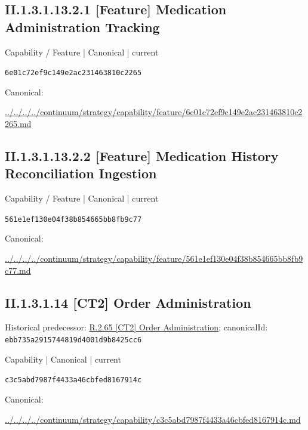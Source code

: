 \documentclass[10pt,a4paper]{article}
\begin{document}
\subsection*{II.1.3.1.13.2.1 [Feature] Medication Administration Tracking}
\label{element-6e01c72ef9c149e2ac231463810c2265}
{\small Capability / Feature | Canonical | current}\par
\texttt{6e01c72ef9c149e2ac231463810c2265}\par
Canonical: \par
{\footnotesize\url{../../../../continuum/strategy/capability/feature/6e01c72ef9c149e2ac231463810c2265.md}}\par
\subsection*{II.1.3.1.13.2.2 [Feature] Medication History Reconciliation Ingestion}
\label{element-561e1ef130e04f38b854665bb8fb9c77}
{\small Capability / Feature | Canonical | current}\par
\texttt{561e1ef130e04f38b854665bb8fb9c77}\par
Canonical: \par
{\footnotesize\url{../../../../continuum/strategy/capability/feature/561e1ef130e04f38b854665bb8fb9c77.md}}\par
\subsection*{II.1.3.1.14 [CT2] Order Administration}
Historical predecessor: \hyperref[element-ebb735a2915744819d4001d9b8425cc6]{R.2.65 [CT2] Order Administration}; canonicalId: \texttt{ebb735a2915744819d4001d9b8425cc6}\par
\label{element-c3c5abd7987f4433a46cbfed8167914c}
{\small Capability | Canonical | current}\par
\texttt{c3c5abd7987f4433a46cbfed8167914c}\par
Canonical: \par
{\footnotesize\url{../../../../continuum/strategy/capability/c3c5abd7987f4433a46cbfed8167914c.md}}\par
\end{document}
